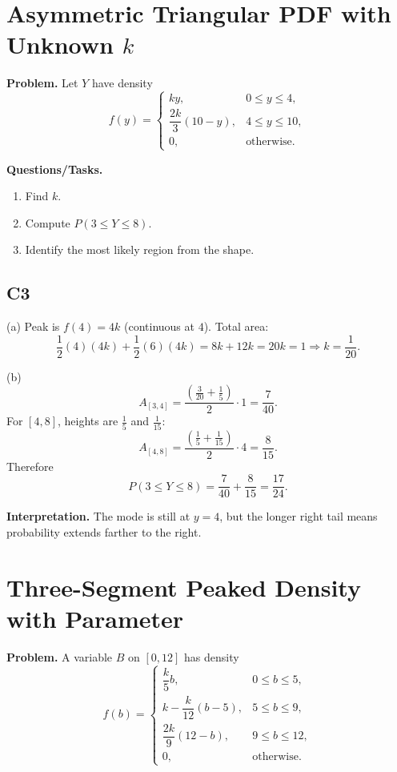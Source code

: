\section{Asymmetric Triangular PDF with Unknown $k$}

\textbf{Problem.}
Let $Y$ have density
\[
f(y)=\begin{cases}
ky, & 0\le y\le 4,\\
\dfrac{2k}{3}(10-y), & 4\le y\le 10,\\
0, & \text{otherwise.}
\end{cases}
\]

\textbf{Questions/Tasks.}
\begin{enumerate}[label=(\alph*)]
\item Find $k$.
\item Compute $P(3\le Y\le 8)$.
\item Identify the most likely region from the shape.
\end{enumerate}

\subsection*{C3}
(a) Peak is $f(4)=4k$ (continuous at $4$).
Total area:
\[
\frac12(4)(4k)+\frac12(6)(4k)=8k+12k=20k=1\Rightarrow k=\frac1{20}.
\]

(b)
\[
A_{[3,4]}=\frac{\left(\frac3{20}+\frac15\right)}{2}\cdot1=\frac7{40}.
\]
For $[4,8]$, heights are $\frac15$ and $\frac1{15}$:
\[
A_{[4,8]}=\frac{\left(\frac15+\frac1{15}\right)}{2}\cdot4=\frac{8}{15}.
\]
Therefore
\[
P(3\le Y\le 8)=\frac7{40}+\frac{8}{15}=\frac{17}{24}.
\]

\textbf{Interpretation.}
The mode is still at $y=4$, but the longer right tail means probability extends farther to the right.

\section{Three-Segment Peaked Density with Parameter}

\textbf{Problem.}
A variable $B$ on $[0,12]$ has density
\[
f(b)=\begin{cases}
\dfrac{k}{5}b, & 0\le b\le 5,\\
k-\dfrac{k}{12}(b-5), & 5\le b\le 9,\\
\dfrac{2k}{9}(12-b), & 9\le b\le 12,\\
0, & \text{otherwise.}
\end{cases}
\]

